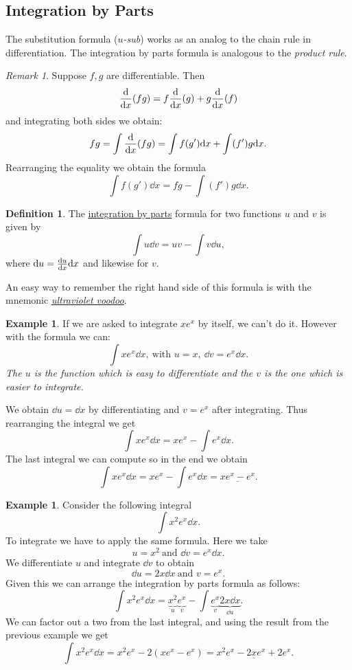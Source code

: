 \documentclass[12pt]{article}
\theoremstyle{plain}
\theoremstyle{definition}
\newtheorem*{Def}{Definition}       %
\newtheorem{Ex}[Th]{Example}           %
\theoremstyle{remark}
\newtheorem*{Rmk}{Remark}      %
\renewcommand{\:}{\colon}           %
\newcommand{\un}[1]{\underline{#1}}
\renewcommand{\.}{\Cdot}                %
\begin{document}
\begin{multicols}{2}
\section*{Integration by Parts}

The substitution formula (\emph{$u$-sub}) works as an analog to the chain rule in differentiation. The integration by parts formula is analogous to the \emph{product rule}.

\begin{Rmk}
  Suppose $f,g$ are differentiable. Then 
  $$\dv{x}(fg)=f\dv{x}(g)+g\dv{x}(f)$$
  and integrating both sides we obtain:
  $$fg=\int\dv{x}(fg)=\int f(g')\dd x+\int (f')g\dd x.$$
  Rearranging the equality we obtain the formula
  $$\int f(g')\dd x=fg-\int (f')g\dd x.$$
\end{Rmk}

\begin{Def}
  The \un{integration by parts} formula for two functions $u$ and $v$ is given by
  $$\int u\dd v=uv-\int v\dd u,$$
  where $\dd u=\dv{u}{x}\dd x$ and likewise for $v$.\par 
  An easy way to remember the right hand side of this formula is with the mnemonic \un{\emph{ultraviolet voodoo}}. 
\end{Def}

\begin{Ex} 
If we are asked to integrate $xe^x$ by itself, we can't do it. However with the formula we can:
$$\int xe^x\dd x,\ \text{with } u=x,\ \dd v=e^x\dd x.$$
\emph{The $u$ is the function which is easy to differentiate and the $v$ is the one which is easier to integrate.}\par 
We obtain $\dd u=\dd x$ by differentiating and $v = e^x$ after integrating. Thus rearranging the integral we get
$$\int xe^x\dd x=xe^x-\int e^x\dd x.$$
The last integral we can compute so in the end we obtain
$$\int xe^x\dd x=xe^x-\int e^x\dd x=\un{xe^x-e^x}.$$
\end{Ex}

\begin{Ex}
  Consider the following integral 
  $$\int x^2 e^x\dd x.$$
  To integrate we have to apply the same formula. Here we take 
  $$u=x^2\ \text{and } \dd v=e^x\dd x.$$
  We differentiate $u$ and integrate $\dd v$ to obtain 
  $$\dd u=2x\dd x\ \text{and } v=e^x.$$
  Given this we can arrange the integration by parts formula as follows:
  $$\int x^2 e^x\dd x= \underbrace{x^2}_{u}\underbrace{e^x}_{v}-\int \underbrace{e^x}_{v}\underbrace{2x\dd x}_{\dd u}.$$
  We can factor out a two from the last integral, and using the result from the previous example we get
  $$\int x^2 e^x\dd x= x^2e^x-2(xe^x-e^x)=\un{x^2e^x-2xe^x+2e^x}.$$
\end{Ex}


\end{multicols}
\end{document}

